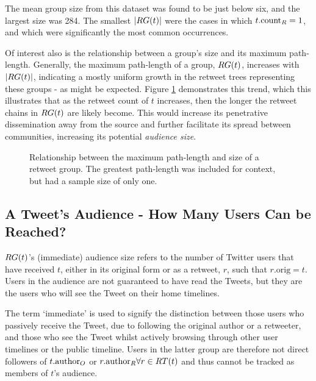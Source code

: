 The mean group size from this dataset was found to be just below six, and the largest size was 284. The smallest $|RG(t)|$ were the cases in which $t.\textrm{count}_R = 1$, and which were significantly the most common occurrences.

Of interest also is the relationship between a group's size and its maximum path-length. Generally, the maximum path-length of a group, $RG(t)$, increases with $|RG(t)|$, indicating a mostly uniform growth in the retweet trees representing these groups - as might be expected. Figure \ref{fig:totalretweets-pathlength} demonstrates this trend, which this illustrates that as the retweet count of $t$ increases, then the longer the retweet chains in $RG(t)$ are likely become. This would increase its penetrative dissemination away from the source and further facilitate its spread between communities, increasing its potential \textit{audience size}.

\begin{figure}[h]
\centering
    \caption{Relationship between the maximum path-length and size of a retweet group. The greatest path-length was included for context, but had a sample size of only one.}
\label{fig:totalretweets-pathlength}
\end{figure}

\subsection{A Tweet's Audience - How Many Users Can be Reached?}
\label{section:audience}
$RG(t)$'s (immediate) audience size refers to the number of Twitter users that have received $t$, either in its original form or as a retweet, $r$, such that $r.\textrm{orig} = t$. Users in the audience are not guaranteed to have read the Tweets, but they are the users who will see the Tweet on their home timelines.

The term `immediate' is used to signify the distinction between those users who passively receive the Tweet, due to following the original author or a retweeter, and those who see the Tweet whilst actively browsing through other user timelines or the public timeline. Users in the latter group are therefore not direct followers of $t.\textrm{author}_O$ or $r.\textrm{author}_R \forall r \in RT(t)$ and thus cannot be tracked as members of $t$'s audience.

